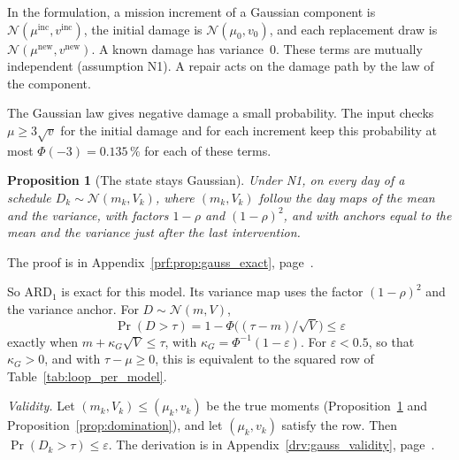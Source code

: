 \documentclass[11pt,a4paper]{article}
\theoremstyle{plain}
\newtheorem{proposition}[theorem]{Proposition}
\theoremstyle{definition}
\theoremstyle{remark}
\begin{document}
In the formulation, a mission increment of a Gaussian component is $\mathcal{N}(\mu^{\mathrm{inc}}, v^{\mathrm{inc}})$, the initial damage is $\mathcal{N}(\mu_0, v_0)$, and each replacement draw is $\mathcal{N}(\mu^{\mathrm{new}}, v^{\mathrm{new}})$.
A known damage has variance~$0$.
These terms are mutually independent (assumption N1).
A repair acts on the damage path by the law of the component.

The Gaussian law gives negative damage a small probability.
The input checks $\mu \ge 3\sqrt{v}$ for the initial damage and for each increment keep this probability at most $\Phi(-3) = 0.135\,\%$ for each of these terms.

\begin{proposition}[The state stays Gaussian]\label{prop:gauss_exact}
Under N1, on every day of a schedule $D_k \sim \mathcal{N}(m_k, V_k)$, where $(m_k, V_k)$ follow the day maps of the mean and the variance, with factors $1-\rho$ and $(1-\rho)^2$, and with anchors equal to the mean and the variance just after the last intervention.
\end{proposition}
The proof is in Appendix~\ref{prf:prop:gauss_exact}, page~\pageref{prf:prop:gauss_exact}.

So $\text{ARD}_1$ is exact for this model.
Its variance map uses the factor $(1-\rho)^2$ and the variance anchor.
For $D \sim \mathcal{N}(m, V)$,
\begin{equation}
  \Pr(D > \tau) = 1 - \Phi\bigl((\tau - m)/\sqrt{V}\bigr) \le \varepsilon
\end{equation}
exactly when $m + \kappa_G\sqrt{V} \le \tau$, with $\kappa_G = \Phi^{-1}(1-\varepsilon)$.
For $\varepsilon < 0.5$, so that $\kappa_G > 0$, and with $\tau - \mu \ge 0$, this is equivalent to the squared row of Table~\ref{tab:loop_per_model}.

\emph{Validity.} Let $(m_k, V_k) \le (\mu_k, v_k)$ be the true moments (Proposition~\ref{prop:gauss_exact} and Proposition~\ref{prop:domination}), and let $(\mu_k, v_k)$ satisfy the row.
Then $\Pr(D_k > \tau) \le \varepsilon$.
The derivation is in Appendix~\ref{drv:gauss_validity}, page~\pageref{drv:gauss_validity}.
\end{document}
